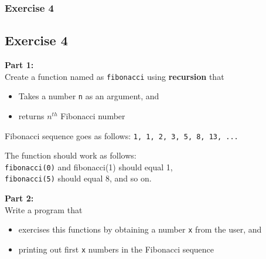 \documentclass{beamer}
\begin{document}
\begin{frame}\frametitle{Exercise 4}
\subsection{Exercise 4} %
\label{sub:exercise_4}
\textbf{Part 1:} \\
Create a function named as \texttt{fibonacci} using \textbf{recursion} that
\begin{itemize}
    \item Takes a number \texttt{n} as an argument, and
    \item returns $n^{th}$ Fibonacci number
\end{itemize}

\vspace{0.3cm}

Fibonacci sequence goes as follows: \texttt{1, 1, 2, 3, 5, 8, 13, ...} \\

\vspace{0.3cm}

The function should work as follows: \\
\texttt{fibonacci(0)} and {fibonacci(1)} should equal 1, \\
\texttt{fibonacci(5)} should equal 8, and so on. \\

\vspace{0.3cm}

\textbf{Part 2:} \\
Write a program that
\begin{itemize}
    \item exercises this functions by obtaining a number \texttt{x} from the user, and
    \item printing out first \texttt{x} numbers in the Fibonacci sequence
\end{itemize}

\end{frame}
\end{document}
